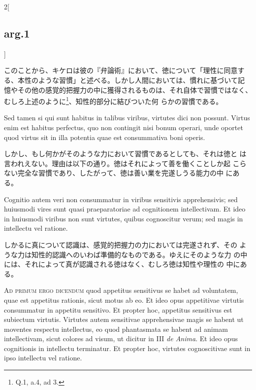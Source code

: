 \documentclass[paper=a4paper,fontsize=10pt,jafontsize=9pt,titlepage]{jlreq}
\begin{document}
\begin{paracol}{2}[\subsection{arg.1}]
\switchcolumn

このことから、キケロは彼の『弁論術』において、徳について「理性に同意す
る、本性のような習慣」と述べる。しかし人間においては、慣れに基づいて記
憶やその他の感覚的把握力の中に獲得されるものは、それ自体で習慣ではなく、
むしろ上述のように\footnote{Q.1, a.4, ad 3.}、知性的部分に結びついた何
らかの習慣である。

\switchcolumn*

Sed tamen si qui sunt habitus in talibus viribus, virtutes dici non
 possunt. Virtus enim est habitus perfectus, quo non contingit nisi
 bonum operari, unde oportet quod virtus sit in illa potentia quae est
 consummativa boni operis.

\switchcolumn

しかし、もし何かがそのような力において習慣であるとしても、それは徳と
 は言われえない。理由は以下の通り。徳はそれによって善を働くことしか起
 こらない完全な習慣であり、したがって、徳は善い業を完遂しうる能力の中
 にある。

\switchcolumn*

Cognitio autem veri non consummatur in
 viribus sensitivis apprehensivis; sed huiusmodi vires sunt quasi
 praeparatoriae ad cognitionem intellectivam. Et ideo in huiusmodi
 viribus non sunt virtutes, quibus cognoscitur verum; sed magis in
 intellectu vel ratione.

\switchcolumn

しかるに真について認識は、感覚的把握力の力においては完遂されず、その
 ような力は知性的認識へのいわば準備的なものである。ゆえにそのような力
 の中には、それによって真が認識される徳はなく、むしろ徳は知性や理性の
 中にある。

\switchcolumn*[\subsection{ad.1}]

{\scshape Ad primum ergo dicendum} quod appetitus sensitivus se habet
ad voluntatem, quae est appetitus rationis, sicut motus ab eo. Et ideo
opus appetitivae virtutis consummatur in appetitu sensitivo. Et
propter hoc, appetitus sensitivus est subiectum virtutis. Virtutes
autem sensitivae apprehensivae magis se habent ut moventes respectu
intellectus, eo quod phantasmata se habent ad animam intellectivam,
sicut colores ad visum, ut dicitur in III {\itshape de Anima}. Et ideo
opus cognitionis in intellectu terminatur. Et propter hoc, virtutes
cognoscitivae sunt in ipso intellectu vel ratione.

\switchcolumn


\end{paracol}
\end{document}
